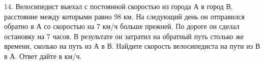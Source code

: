14. Велосипедист выехал с постоянной скоростью из города А в город В, расстояние между которыми равно 98 км. На следующий день он отправился обратно в А со скоростью на 7 км/ч больше прежней. По дороге он сделал остановку на 7 часов. В результате он затратил на обратный путь столько же времени, сколько на путь из А в В. Найдите скорость велосипедиста на пути из В в А. Ответ дайте в км/ч.\\
